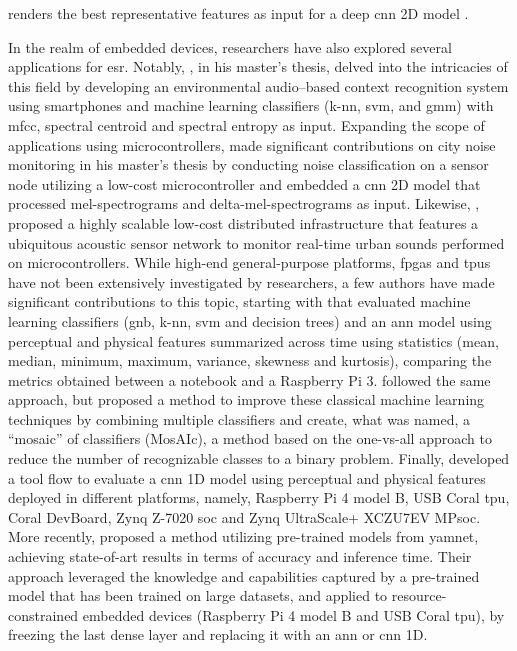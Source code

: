 renders the best representative features as input for a deep \gls{cnn} 2D model \cite{Tripathi2021}.

In the realm of embedded devices, researchers have also explored several applications for \gls{esr}. Notably, \textcite{Abreha2014}, in his master's thesis, delved into the intricacies of this field by developing an environmental audio–based context recognition system using smartphones and machine learning classifiers (\gls{k-nn}, \gls{svm}, and \gls{gmm}) with \gls{mfcc}, spectral centroid and spectral entropy as input. Expanding the scope of applications using microcontrollers, \textcite{Nordby2019} made significant contributions on city noise monitoring in his master’s thesis by conducting noise classification on a sensor node utilizing a low-cost microcontroller and embedded a \gls{cnn} 2D model that processed mel-spectrograms and delta-mel-spectrograms as input. Likewise, \textcite{VidaaVila2020}, proposed a highly scalable low-cost distributed infrastructure that features a ubiquitous acoustic sensor network to monitor real-time urban sounds performed on microcontrollers. While high-end general-purpose platforms, \gls{fpga}s and \gls{tpu}s have not been extensively investigated by researchers, a few authors have made significant contributions to this topic, starting with \textcite{Silva2019} that evaluated machine learning classifiers (\gls{gnb}, \gls{k-nn}, \gls{svm} and decision trees) and an \gls{ann} model using perceptual and physical features summarized across time using statistics (mean, median, minimum, maximum, variance, skewness and kurtosis), comparing the metrics obtained between a notebook and a Raspberry Pi 3. \textcite{Lhoest2021} followed the same approach, but proposed a method to improve these classical machine learning techniques by combining multiple classifiers and create, what was named, a “mosaic” of classifiers (MosAIc), a method based on the one-vs-all approach to reduce the number of recognizable classes to a binary problem. Finally, \textcite{Vandendriessche2021} developed a tool flow to evaluate a \gls{cnn} 1D model using perceptual and physical features deployed in different platforms, namely, Raspberry Pi 4 model B, USB Coral \gls{tpu}, Coral DevBoard, Zynq Z-7020 \gls{soc} and Zynq UltraScale+ XCZU7EV MP\gls{soc}. More recently, \textcite{Lamrini2023} proposed a method utilizing pre-trained models from \gls{yamnet}, achieving state-of-art results in terms of accuracy and inference time. Their approach leveraged the knowledge and capabilities captured by a pre-trained model that has been trained on large datasets, and applied to resource-constrained embedded devices (Raspberry Pi 4 model B and USB Coral \gls{tpu}), by freezing the last dense layer and replacing it with an \gls{ann} or \gls{cnn} 1D. 

